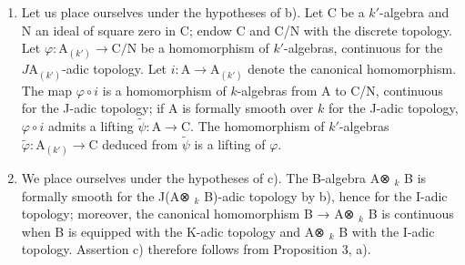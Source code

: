 \begin{enumerate}
\item
  Let us place ourselves under the hypotheses of b). Let C be a \(k'\)-algebra and N an ideal of square zero in C; endow C and C/N with the discrete topology. Let \(\varphi : \mathrm{A}_{(k')} \longrightarrow \mathrm{C/N}\) be a homomorphism of \(k'\)-algebras, continuous for the \(J\mathrm{A}_{(k')}\)-adic topology. Let \(i : \mathrm{A} \to \mathrm{A}_{(k')}\) denote the canonical homomorphism. The map \(\varphi \circ i\) is a homomorphism of \(k\)-algebras from A to C/N, continuous for the J-adic topology; if A is formally smooth over \(k\) for the J-adic topology, \(\varphi \circ i\) admits a lifting \(\tilde{\psi} : \mathrm{A} \to \mathrm{C}\). The homomorphism of \(k'\)-algebras \(\tilde{\varphi} : \mathrm{A}_{(k')} \longrightarrow \mathrm{C}\) deduced from \(\tilde{\psi}\) is a lifting of \(\varphi\).
\item
  We place ourselves under the hypotheses of c). The B-algebra A⊗ \(_{k}\) B is formally smooth for the J(A⊗ \(_{k}\) B)-adic topology by b), hence for the I-adic topology; moreover, the canonical homomorphism B → A⊗ \(_{k}\) B is continuous when B is equipped with the K-adic topology and A⊗ \(_{k}\) B with the I-adic topology. Assertion c) therefore follows from Proposition 3, a).
\end{enumerate}

